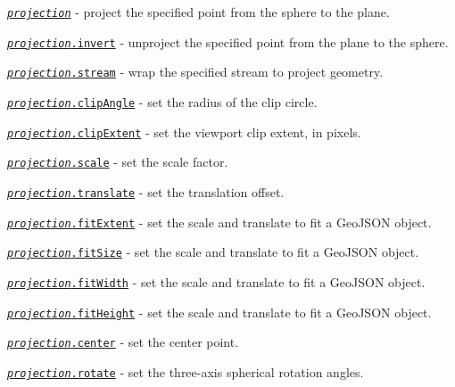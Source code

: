 \begin{DoxyItemize}
\item \href{https://github.com/d3/d3-geo/blob/master/README.md#_projection}{\tt {\itshape projection}} -\/ project the specified point from the sphere to the plane.
\item \href{https://github.com/d3/d3-geo/blob/master/README.md#projection_invert}{\tt {\itshape projection}.invert} -\/ unproject the specified point from the plane to the sphere.
\item \href{https://github.com/d3/d3-geo/blob/master/README.md#projection_stream}{\tt {\itshape projection}.stream} -\/ wrap the specified stream to project geometry.
\item \href{https://github.com/d3/d3-geo/blob/master/README.md#projection_clipAngle}{\tt {\itshape projection}.clip\+Angle} -\/ set the radius of the clip circle.
\item \href{https://github.com/d3/d3-geo/blob/master/README.md#projection_clipExtent}{\tt {\itshape projection}.clip\+Extent} -\/ set the viewport clip extent, in pixels.
\item \href{https://github.com/d3/d3-geo/blob/master/README.md#projection_scale}{\tt {\itshape projection}.scale} -\/ set the scale factor.
\item \href{https://github.com/d3/d3-geo/blob/master/README.md#projection_translate}{\tt {\itshape projection}.translate} -\/ set the translation offset.
\item \href{https://github.com/d3/d3-geo/blob/master/README.md#projection_fitExtent}{\tt {\itshape projection}.fit\+Extent} -\/ set the scale and translate to fit a Geo\+J\+S\+ON object.
\item \href{https://github.com/d3/d3-geo/blob/master/README.md#projection_fitSize}{\tt {\itshape projection}.fit\+Size} -\/ set the scale and translate to fit a Geo\+J\+S\+ON object.
\item \href{https://github.com/d3/d3-geo/blob/master/README.md#projection_fitWidth}{\tt {\itshape projection}.fit\+Width} -\/ set the scale and translate to fit a Geo\+J\+S\+ON object.
\item \href{https://github.com/d3/d3-geo/blob/master/README.md#projection_fitHeight}{\tt {\itshape projection}.fit\+Height} -\/ set the scale and translate to fit a Geo\+J\+S\+ON object.
\item \href{https://github.com/d3/d3-geo/blob/master/README.md#projection_center}{\tt {\itshape projection}.center} -\/ set the center point.
\item \href{https://github.com/d3/d3-geo/blob/master/README.md#projection_rotate}{\tt {\itshape projection}.rotate} -\/ set the three-\/axis spherical rotation angles.

\end{DoxyItemize}
